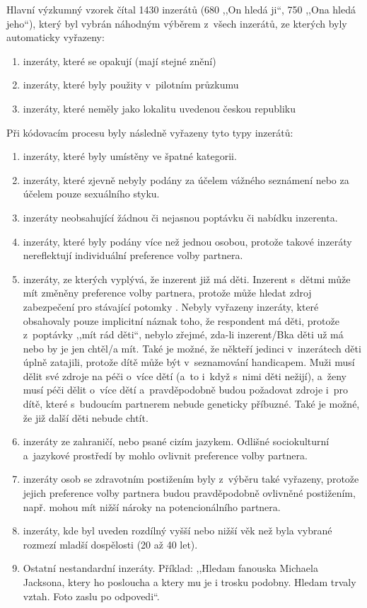 \documentclass[a4paper, 12pt, notitlepage, oneside, numbers=noenddot]{report}
\begin{document}
Hlavní výzkumný vzorek čítal 1430 inzerátů (680 ,,On hledá ji``, 750
,,Ona hledá jeho``), který byl vybrán náhodným výběrem z~všech
inzerátů, ze kterých byly automaticky vyřazeny:

\begin{enumerate}
\item inzeráty, které se opakují (mají stejné znění)
\item inzeráty, které byly použity v~pilotním průzkumu
\item inzeráty, které neměly jako lokalitu uvedenou českou republiku
\end{enumerate}
Při kódovacím procesu byly následně vyřazeny tyto typy inzerátů:

\begin{enumerate}
\item inzeráty, které byly umístěny ve špatné kategorii.
\item inzeráty, které zjevně nebyly podány za účelem vážného seznámení
  nebo za účelem pouze sexuálního styku.
\item inzeráty neobsahující žádnou či nejasnou poptávku či nabídku
  inzerenta.
\item inzeráty, které byly podány více než jednou osobou, protože
  takové inzeráty nereflektují individuální preference volby partnera.
\item inzeráty, ze kterých vyplývá, že inzerent již má děti. Inzerent
  s~dětmi může mít změněny preference volby partnera, protože může
  hledat zdroj zabezpečení pro stávající potomky
  \citep{WayfordDunbar1995}.  Nebyly vyřazeny inzeráty, které
  obsahovaly pouze implicitní náznak toho, že respondent má děti,
  protože z~poptávky ,,mít rád děti``, nebylo zřejmé, zda-li
  inzerent/Bka děti už má nebo by je jen chtěl/a mít.  Také je možné,
  že někteří jedinci v~inzerátech děti úplně zatajili, protože dítě
  může být v~seznamování handicapem.  Muži musí dělit své zdroje na
  péči o~více dětí (a~to i~když s~nimi děti nežijí), a~ženy musí péči
  dělit o~více dětí a~pravděpodobně budou požadovat zdroje i~pro dítě,
  které s~budoucím partnerem nebude geneticky příbuzné. Také je možné,
  že již další děti nebude chtít.
\item inzeráty ze zahraničí, nebo psané cizím jazykem.  Odlišné
  sociokulturní a~jazykové prostředí by mohlo ovlivnit preference
  volby partnera.
\item inzeráty osob se zdravotním postižením byly z~výběru také
  vyřazeny, protože jejich preference volby partnera budou
  pravděpodobně ovlivněné postižením, např. mohou mít nižší nároky na
  potencionálního partnera.
\item inzeráty, kde byl uveden rozdílný vyšší nebo nižší věk než byla
  vybrané rozmezí mladší dospělosti (20 až 40 let).
\item Ostatní nestandardní inzeráty.  Příklad: ,,Hledam fanouska
  Michaela Jacksona, ktery ho posloucha a ktery mu je i trosku
  podobny.  Hledam trvaly vztah.  Foto zaslu po odpovedi``.
\end{enumerate}
\end{document}
